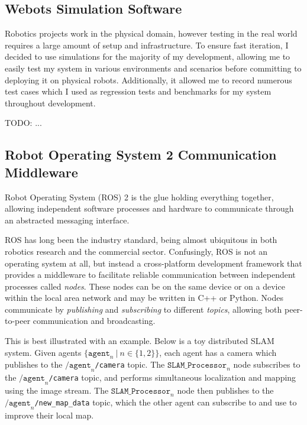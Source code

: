 \subsection{Webots Simulation Software}
\label{sec:webots-simulator}

Robotics projects work in the physical domain, however testing in the real world requires a large amount of setup and infrastructure. To ensure fast iteration, I decided to use simulations for the majority of my development, allowing me to easily test my system in various environments and scenarios before committing to deploying it on physical robots. Additionally, it allowed me to record numerous test cases which I used as regression tests and benchmarks for my system throughout development.

TODO: ...


\subsection{Robot Operating System 2 Communication Middleware}
\label{sec:ros-2}
Robot Operating System (ROS) 2 is the glue holding everything together, allowing independent software processes and hardware to communicate through an abstracted messaging interface.

ROS has long been the industry standard, being almost ubiquitous in both robotics research and the commercial sector. Confusingly, ROS is not an operating system at all, but instead a cross-platform development framework that provides a middleware to facilitate reliable communication between independent processes called \textit{nodes}. These nodes can be on the same device or on a device within the local area network and may be written in C++ or Python. Nodes communicate by \textit{publishing} and \textit{subscribing} to different \textit{topics}, allowing both peer-to-peer communication and broadcasting.

This is best illustrated with an example. Below is a toy distributed SLAM system. Given agents $\{ \texttt{agent}_n \ | \ n \in \{1, 2\} \}$, each agent has a camera which publishes to the $\texttt{/agent}_n$\verb|/camera| topic. The $\texttt{SLAM\_Processor}_n$ node subscribes to the $\texttt{/agent}_n$\verb|/camera| topic, and performs simultaneous localization and mapping using the image stream. The $\texttt{SLAM\_Processor}_n$ node then publishes to the $\texttt{/agent}_n$\verb|/new_map_data| topic, which the other agent can subscribe to and use to improve their local map.

